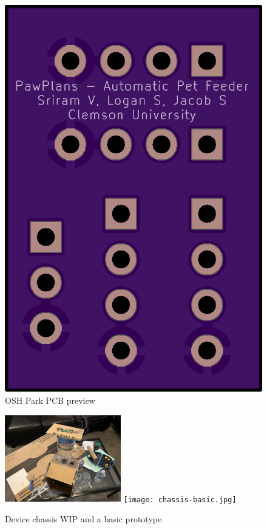 \documentclass[12pt]{article}
\begin{document}
\begin{figure}[H]
    \includegraphics[height=0.5\textheight]{board-back.png}
    \caption{OSH Park PCB preview}
\end{figure}
\begin{figure}[H]
    \centering
    \includegraphics[width=0.45\textwidth]{chassis-wip.jpg}
    \texttt{[image: chassis-basic.jpg]}
    \caption{Device chassis WIP and a basic prototype}
\end{figure}
\end{document}
